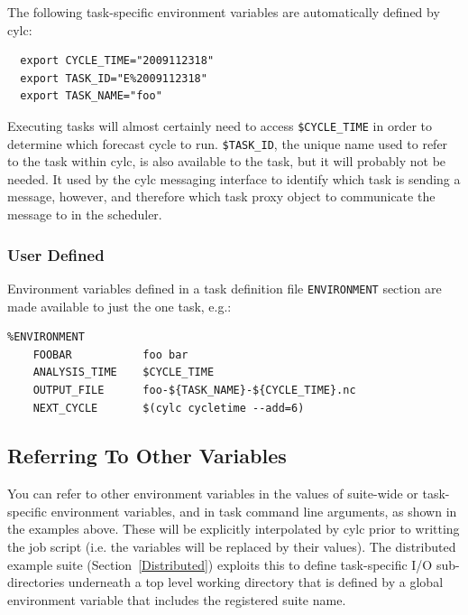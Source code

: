 \documentclass[11pt,a4paper]{article}
\begin{document}
The following task-specific environment variables are automatically
defined by cylc:

\begin{lstlisting}
  export CYCLE_TIME="2009112318"
  export TASK_ID="E%2009112318"
  export TASK_NAME="foo"
\end{lstlisting}

Executing tasks will almost certainly need to access
\lstinline=$CYCLE_TIME= in order to determine which forecast cycle to
run. \lstinline=$TASK_ID=, the unique name used to refer to the task
within cylc, is also available to the task, but it will probably not be
needed. It used by the cylc messaging interface to identify which task
is sending a message, however, and therefore which task proxy object to
communicate the message to in the scheduler.

\subsubsection{User Defined}
\lstset{language=cylctaskdef}

Environment variables defined in a task definition file
\lstinline=ENVIRONMENT= section are made available
to just the one task, e.g.:

\begin{lstlisting}
%ENVIRONMENT
    FOOBAR           foo bar
    ANALYSIS_TIME    $CYCLE_TIME
    OUTPUT_FILE      foo-${TASK_NAME}-${CYCLE_TIME}.nc
    NEXT_CYCLE       $(cylc cycletime --add=6)
\end{lstlisting}

\lstset{language=bash}

\subsection{Referring To Other Variables}
\label{ReferringToOtherVariables}

\lstset{language=bash}

You can refer to other environment variables in the values of
suite-wide or task-specific environment variables, and in task command
line arguments, as shown in the examples above. These will be explicitly
interpolated by cylc prior to writting the job script (i.e.
the variables will be replaced by their values).  The distributed example
suite (Section~\ref{Distributed}) exploits this to define task-specific
I/O sub-directories underneath a top level working directory that is
defined by a global environment variable that includes the registered
suite name.
\end{document}
